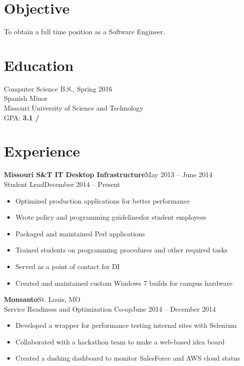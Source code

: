 \documentclass[margin]{res}
\begin{document}
  \begin{resume} 
   
    \section{Objective} 
      To obtain a full time position as a Software Engineer.

    \section{Education} 
      Computer Science B.S., Spring 2016 \\
      Spanish Minor \\
      Missouri University of Science and Technology \\
      GPA: {\bf 3.1 \slash {}}

    \section{Experience}
       \textbf{Missouri S\&T IT Desktop Infrastructure}\hfill May 2013 -- June 2014\\
       Student Lead\hfill December 2014 -- Present 
       \begin{itemize} \itemsep -1pt  %
         \item Optimized production applications for better performance
         \item Wrote policy and programming guidelinesfor student employees
         \item Packaged and maintained Perl applications
         \item Trained students on programming procedures and other required tasks
         \item Served as a point of contact for DI
         \item Created and maintained custom Windows 7 builds for campus hardware
       \end{itemize}

       \textbf{Monsanto}\hfill St. Louis, MO\\
       Service Readiness and Optimization Co-op\hfill June 2014 -- December 2014
       \begin{itemize} \itemsep -1pt  %
         \item Developed a wrapper for performance testing internal sites with Selenium
         \item Collaborated with a hackathon team to make a web-based idea board 
         \item Created a dashing dashboard to monitor SalesForce and AWS cloud status
       \end{itemize}


\end{resume}
\end{document}
